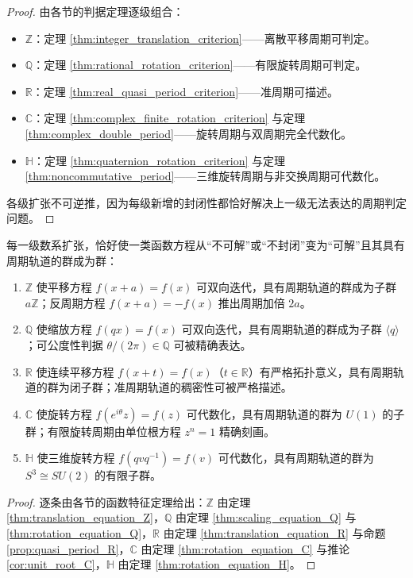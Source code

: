 \begin{proof}
由各节的判据定理逐级组合：
\begin{itemize}
    \item $\mathbb{Z}$：定理 \ref{thm:integer_translation_criterion}——离散平移周期可判定。
    \item $\mathbb{Q}$：定理 \ref{thm:rational_rotation_criterion}——有限旋转周期可判定。
    \item $\mathbb{R}$：定理 \ref{thm:real_quasi_period_criterion}——准周期可描述。
    \item $\mathbb{C}$：定理 \ref{thm:complex_finite_rotation_criterion} 与定理 \ref{thm:complex_double_period}——旋转周期与双周期完全代数化。
    \item $\mathbb{H}$：定理 \ref{thm:quaternion_rotation_criterion} 与定理 \ref{thm:noncommutative_period}——三维旋转周期与非交换周期可代数化。
\end{itemize}
各级扩张不可逆推，因为每级新增的封闭性都恰好解决上一级无法表达的周期判定问题。
\end{proof}

\begin{theorem}[数系扩张与函数方程可解性的对应]\label{thm:number_system_function_equation}
每一级数系扩张，恰好使一类函数方程从“不可解”或“不封闭”变为“可解”且其具有周期轨道的群成为群：
\begin{enumerate}[label=(\roman*)]
    \item $\mathbb{Z}$ 使平移方程 $f(x+a)=f(x)$ 可双向迭代，具有周期轨道的群成为子群 $a\mathbb{Z}$；反周期方程 $f(x+a)=-f(x)$ 推出周期加倍 $2a$。
    \item $\mathbb{Q}$ 使缩放方程 $f(qx)=f(x)$ 可双向迭代，具有周期轨道的群成为子群 $\langle q\rangle$；可公度性判据 $\theta/(2\pi)\in\mathbb{Q}$ 可被精确表达。
    \item $\mathbb{R}$ 使连续平移方程 $f(x+t)=f(x)$（$t\in\mathbb{R}$）有严格拓扑意义，具有周期轨道的群为闭子群；准周期轨道的稠密性可被严格描述。
    \item $\mathbb{C}$ 使旋转方程 $f(e^{i\theta}z)=f(z)$ 可代数化，具有周期轨道的群为 $U(1)$ 的子群；有限旋转周期由单位根方程 $z^n=1$ 精确刻画。
    \item $\mathbb{H}$ 使三维旋转方程 $f(qvq^{-1})=f(v)$ 可代数化，具有周期轨道的群为 $S^3\cong SU(2)$ 的有限子群。
\end{enumerate}
\end{theorem}

\begin{proof}
逐条由各节的函数特征定理给出：$\mathbb{Z}$ 由定理 \ref{thm:translation_equation_Z}，$\mathbb{Q}$ 由定理 \ref{thm:scaling_equation_Q} 与 \ref{thm:rotation_equation_Q}，$\mathbb{R}$ 由定理 \ref{thm:translation_equation_R} 与命题 \ref{prop:quasi_period_R}，$\mathbb{C}$ 由定理 \ref{thm:rotation_equation_C} 与推论 \ref{cor:unit_root_C}，$\mathbb{H}$ 由定理 \ref{thm:rotation_equation_H}。
\end{proof}

